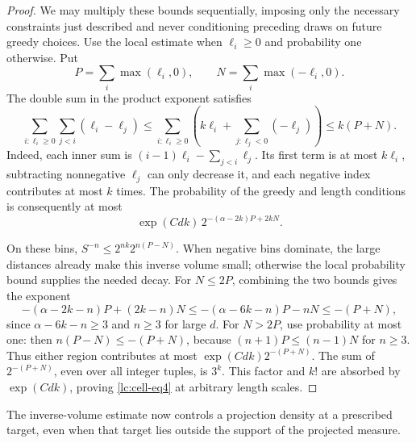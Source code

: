 \begin{proof}
We may multiply these bounds sequentially, imposing only the necessary
constraints just described and never conditioning preceding draws on
future greedy choices. Use the local estimate when \(\ell_i\ge0\)
and probability one otherwise. Put
\[
 P=\sum_i\max(\ell_i,0),\qquad N=\sum_i\max(-\ell_i,0).
\]
The double sum in the product exponent satisfies
\[
 \sum_{i:\ell_i\ge0}\sum_{j<i}(\ell_i-\ell_j)
 \le \sum_{i:\ell_i\ge0}\left(k\ell_i+
                         \sum_{j:\ell_j<0}(-\ell_j)\right)
 \le k(P+N).
\]
Indeed, each inner sum is \((i-1)\ell_i-\sum_{j<i}\ell_j\).
Its first term is at most \(k\ell_i\), subtracting nonnegative
\(\ell_j\) can only decrease it, and each negative index contributes
at most \(k\) times. The probability of the greedy and length conditions
is consequently at most
\[
 \exp(Cdk)\,2^{-(\alpha-2k)P+2kN}.
\]

On these bins, \(S^{-n}\le2^{nk}2^{n(P-N)}\). When negative bins
dominate, the large distances already make this inverse volume small;
otherwise the local probability bound supplies the needed decay.
For \(N\le2P\), combining the two bounds gives the exponent
\[
 -(\alpha-2k-n)P+(2k-n)N
 \le -(\alpha-6k-n)P-nN\le -(P+N),
\]
since \(\alpha-6k-n\ge3\) and \(n\ge3\) for large \(d\).
For \(N>2P\), use probability at most one: then
\(n(P-N)\le -(P+N)\), because
\((n+1)P\le(n-1)N\) for \(n\ge3\).
Thus either region contributes at most \(\exp(Cdk)2^{-(P+N)}\).
The sum of \(2^{-(P+N)}\), even over all integer tuples, is \(3^k\).
This factor and \(k!\) are absorbed by \(\exp(Cdk)\), proving
\eqref{lc:cell-eq4} at arbitrary length scales.
\end{proof}

The inverse-volume estimate now controls a projection density at a prescribed target, even when that target lies outside the support of the projected measure.

